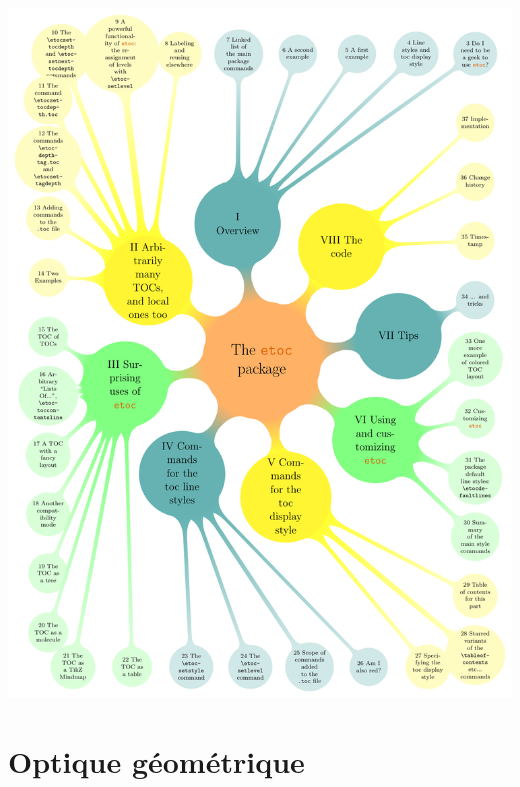 \documentclass[a4paper, 12pt, garamond]{book}
\begin{document}
\begin{adjustwidth}{-1cm}{-1cm}
	\pagestyle{empty}
	\includegraphics[width=\linewidth]{cover}
\end{adjustwidth}
\newpage

\tableofcontents
\part{Optique géométrique}


% 
% 
\end{document}

